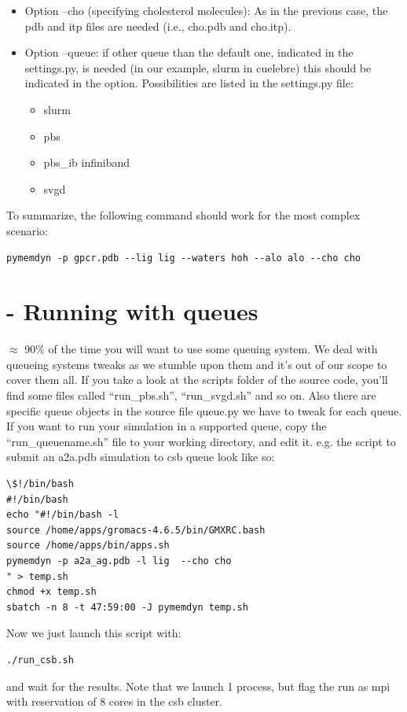 \documentclass[10pt, oneside, pdftex]{article}
\begin{document}
\begin{itemize}
\begin{itemize}
{  structural waters: ion-local.pdb  and ion-local.itp.}  
\item{Option --cho
  (specifying cholesterol molecules): As in the previous case, the pdb
  and  itp files  are needed  (i.e., cho.pdb  and cho.itp).}
\item{Option --queue: if  other queue than the  default one, indicated
  in the  settings.py, is needed  (in our example, slurm  in cuelebre)
  this should be indicated in  the option. Possibilities are listed in
  the settings.py file:}
\begin{itemize}
\item{slurm}
\item{pbs}
\item{pbs\_ib   infiniband}
\item{svgd}
\end{itemize}
\end{itemize}
\end{itemize}

\noindent To summarize, the following command should work for the most 
complex scenario:
\begin{Verbatim}
pymemdyn -p gpcr.pdb --lig lig --waters hoh --alo alo --cho cho
\end{Verbatim}

\section*{ - Running with queues}
$\approx$  90\%  of  the  time  you will  want  to  use  some  queuing
system. We deal  with queueing systems tweaks as we  stumble upon them
and it's out  of our scope to cover  them all.  If you take  a look at
the scripts folder  of the source code, you'll find  some files called
``run\_pbs.sh'', ``run\_svgd.sh''  and so on. Also  there are specific
queue objects  in the source file  queue.py we have to  tweak for each
queue.  If you want to run  your simulation in a supported queue, copy
the  ``run\_queuename.sh'' file  to your  working directory,  and edit
it. e.g.  the script to submit an a2a.pdb simulation to csb queue look
like so:
\begin{Verbatim}
\$!/bin/bash   
#!/bin/bash
echo "#!/bin/bash -l
source /home/apps/gromacs-4.6.5/bin/GMXRC.bash
source /home/apps/bin/apps.sh
pymemdyn -p a2a_ag.pdb -l lig  --cho cho
" > temp.sh
chmod +x temp.sh
sbatch -n 8 -t 47:59:00 -J pymemdyn temp.sh
\end{Verbatim}

Now  we  just launch this script with: 
\begin{Verbatim}
./run_csb.sh
\end{Verbatim}
and wait  for the results. Note that  we launch 1 process,
but flag the run as mpi with reservation of 8 cores in the csb cluster.
\end{document}
